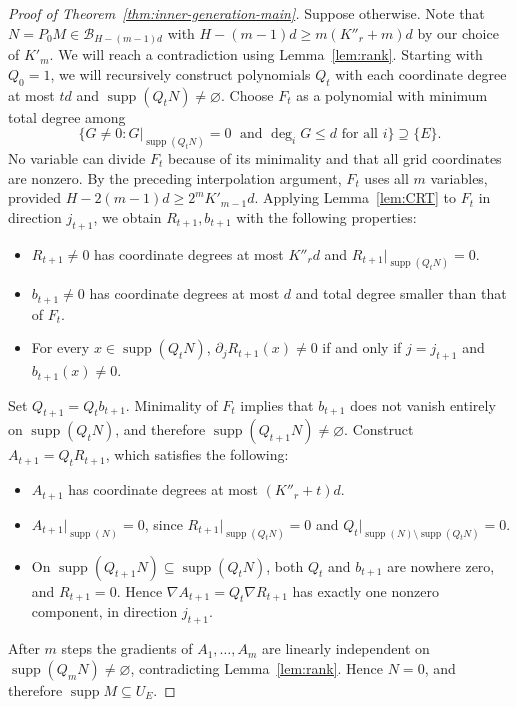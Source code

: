 \documentclass[10pt,a4paper]{amsart}
\newcommand{\supp}{\operatorname{supp}}
\theoremstyle{plain}
\theoremstyle{definition}
\theoremstyle{remark}
\begin{document}
\begin{proof}[Proof of Theorem~\ref{thm:inner-generation-main}]
Suppose otherwise. Note that  $N = P_0 M \in \mathcal B_{H-(m-1)d}$ with \(H-(m-1)d\ge m(K''_r+m)d\) by our choice of $K'_m$. We will reach a contradiction using  Lemma~\ref{lem:rank}. Starting with $Q_0=1$, we will recursively construct polynomials $Q_t$ with each coordinate degree at most $td$ and $\supp(Q_t N)\ne\varnothing$.
Choose $F_t$ as a polynomial with minimum total degree among \[\{G \neq 0: G|_{\supp(Q_t N)} = 0\; \text{  and } \deg_i G \le d \text{ for all } i\} \supseteq \{E\}.\]
No variable can divide $F_t$ because of its minimality and that all grid coordinates are nonzero. By the preceding
interpolation argument, $F_t$ uses all $m$ variables, provided
$H-2(m-1)d\ge2^mK'_{m-1}d$.
Applying Lemma~\ref{lem:CRT} to $F_t$ in direction $j_{t+1}$, we obtain $R_{t+1}, b_{t+1}$ with the following properties:
\begin{itemize}
    \item $R_{t+1} \neq 0$ has coordinate degrees at most $K''_r d$ and $R_{t+1}|_{\supp (Q_t N)} = 0$.
    \item $b_{t+1} \neq 0$ has coordinate degrees at most $d$ and total degree smaller than that of $F_t$.
    \item For every $x \in \supp(Q_t N)$, $\partial_j R_{t+1}(x) \neq 0$ if and only if $j = j_{t+1}$ and $b_{t+1}(x) \neq 0$.
\end{itemize}
Set $Q_{t+1}=Q_tb_{t+1}$. Minimality of $F_t$ implies that
$b_{t+1}$ does not vanish entirely on $\supp(Q_t N)$, and therefore $\supp(Q_{t+1} N) \neq \varnothing$.
Construct $A_{t+1} = Q_t R_{t+1}$, which satisfies the following:
\begin{itemize}
    \item $A_{t+1}$ has coordinate degrees at most
$(K''_r+t)d$.
    \item $A_{t+1}|_{\supp(N)} = 0$, since $R_{t+1}|_{\supp(Q_t N)} = 0$ and $Q_t|_{\supp(N)\setminus \supp(Q_t N)} = 0$.
    \item On $\supp(Q_{t+1} N) \subseteq \supp(Q_{t} N)$, both $Q_t$ and $b_{t+1}$ are nowhere zero, and $R_{t+1} = 0$. Hence $\nabla A_{t+1}=Q_t\nabla R_{t+1}$ has exactly one
nonzero component, in direction $j_{t+1}$.
\end{itemize}
After $m$ steps the gradients of $A_1,\ldots,A_m$ are linearly independent
on $\supp(Q_{m} N)\ne\varnothing$, contradicting Lemma~\ref{lem:rank}.
Hence $N = 0$, and therefore $\supp M\subseteq U_E$.


\end{proof}
\end{document}
